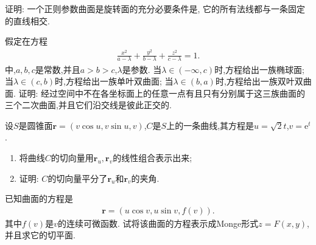 \documentclass[../../main.tex]{subfiles}%
\begin{document}
\begin{example}
证明: 一个正则参数曲面是旋转面的充分必要条件是, 它的所有法线都与一条固定的直线相交.
\end{example}

\begin{example}
假定在方程
\begin{align*}
\frac{x^2}{a-\lambda}+\frac{y^2}{b-\lambda}+\frac{z^2}{c-\lambda}=1.
\end{align*}
中,$a,b,c$是常数,并且$a>b>c$,$\lambda$是参数. 当$\lambda\in(-\infty,c)$时,方程给出一族椭球面; 当$\lambda\in(c,b)$时,方程给出一族单叶双曲面; 当$\lambda\in(b,a)$时,方程给出一族双叶双曲面. 证明: 经过空间中不在各坐标面上的任意一点有且只有分别属于这三族曲面的三个二次曲面,并且它们沿交线是彼此正交的.
\end{example}

\begin{example}
设$S$是圆锥面$\bm{r}=(v\cos u,v\sin u,v)$,$C$是$S$上的一条曲线,其方程是$u=\sqrt{2}t$,$v=\mathrm{e}^t$.
\begin{enumerate}[(1)]
\item 将曲线$C$的切向量用$\bm{r}_u,\bm{r}_v$的线性组合表示出来;
\item 证明: $C$的切向量平分了$\bm{r}_u$和$\bm{r}_v$的夹角.
\end{enumerate}
\end{example}

\begin{example}
已知曲面的方程是
\begin{align*}
\bm{r}=(u\cos v,u\sin v,f(v)).
\end{align*}
其中$f(v)$是$v$的连续可微函数. 试将该曲面的方程表示成Monge形式$z=F(x,y)$,并且求它的切平面.
\end{example}
\end{document}
